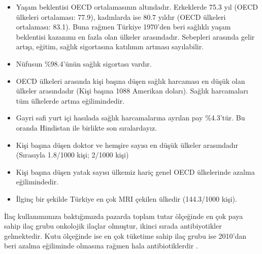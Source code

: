 \begin{itemize}
\item Yaşam beklentisi OECD ortalamasının altındadır. Erkeklerde 75.3 yıl (OECD ülkeleri ortalaması: 77.9), kadınlarda ise 80.7 yıldır (OECD ülkeleri ortalaması: 83.1). Buna rağmen Türkiye 1970'den beri sağlıklı yaşam beklentisi kazanımı en fazla olan ülkeler arasındadır. Sebepleri arasında gelir artışı, eğitim, sağlık sigortasına katılımın artması sayılabilir. 
\item Nüfusun \%98.4'ünün sağlık sigortası vardır.
\item OECD ülkeleri arasında kişi başına düşen sağlık harcaması en düşük olan ülkeler arasındadır (Kişi başına 1088 Amerikan doları). Sağlık harcamaları tüm ülkelerde artma eğilimindedir.
\item Gayri safi yurt içi hasılada sağlık harcamalarına ayrılan pay \%4.3'tür. Bu oranda Hindistan ile birlikte son sıralardayız. 
\item Kişi başına düşen doktor ve hemşire sayısı en düşük ülkeler arasındadır (Sırasıyla 1.8/1000 kişi; 2/1000 kişi)
\item Kişi başına düşen yatak sayısı ülkemiz hariç genel OECD ülkelerinde azalma eğilimindedir.
\item İlginç bir şekilde Türkiye en çok MRI çekilen ülkedir (144.3/1000 kişi).
\end{itemize}

İlaç kullanımımıza baktığımızda pazarda toplam tutar ölçeğinde en çok paya sahip ilaç grubu onkolojik ilaçlar olmuştur, ikinci sırada antibiyotikler gelmektedir. Kutu ölçeğinde ise en çok tüketime sahip ilaç grubu ise 2010’dan beri azalma eğiliminde olmasına rağmen hala antibiotiklerdir \cite{sektor17}.



